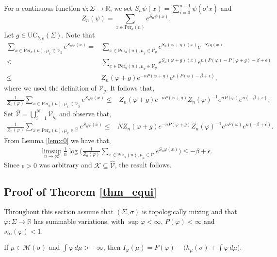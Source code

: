 \documentclass[letterpaper,11pt]{amsart}
\numberwithin{equation}{section}     %
\newcommand{\M}{\mathcal{M}}
\newcommand{\R}{\mathbb{R}}
\def\phi{\varphi}
\def\R{{\mathbb R}}
\def\M{{\mathcal M}}
\def\le{\leqslant}
\def\M{\mathcal{M}}
\begin{document}
For a continuous function $\psi:\Sigma\to\R$, we set $S_n \psi(x)= \sum_{i=0}^{n-1} \psi(\sigma^i x)$ and  
$$Z_n(\psi)=\sum_{x\in \text{Per}_a(n)}e^{S_n\psi(x)}. $$
Let $g\in \text{UC}_{b,\rho}(\Sigma)$. Note that 
 \begin{align*}
\sum_{x\in \text{Per}_a(n), \mu_x\in \mathcal{V}_g}e^{S_n\phi(x)} = & \sum_{x\in \text{Per}_a(n), \mu_x\in \mathcal{V}_g}e^{S_n(\phi+g)(x)}e^{-S_ng(x)}\\
\le & \sum_{x\in \text{Per}_a(n), \mu_x\in \mathcal{V}_g}e^{S_n(\phi+g)(x)} e^{n(P(\phi)-P(\phi+g)-\beta+\epsilon)}\\
\le & Z_n(\phi+g)e^{-nP(\phi+g)}e^{n(P(\phi)-\beta+\epsilon)},
\end{align*}
where we used the definition of $\mathcal{V}_g$. It follows that,
 \begin{align*}
\frac{1}{Z_n(\phi)}\sum_{x\in \text{Per}_a(n), \mu_x\in \mathcal{V}_g}e^{S_n\phi(x)} \le & Z_n(\phi+g)e^{-nP(\phi+g)}Z_n(\phi)^{-1}e^{nP(\phi)}e^{n(-\beta+\epsilon)}.
\end{align*}
Set $\widehat{\mathcal{V}}=\bigcup_{i=1}^N \mathcal{V}_{g_i}$ and observe that,
 \begin{align*}
\frac{1}{Z_n(\phi)}\sum_{x\in \text{Per}_a(n), \mu_x\in \widehat{\mathcal{V}}}e^{S_n\phi(x)} \le & N Z_n(\phi+g)e^{-nP(\phi+g)}Z_n(\phi)^{-1}e^{nP(\phi)}e^{n(-\beta+\epsilon)}.
\end{align*}
From Lemma \ref{lem:c0}  we have that, 
 \begin{align*}
\limsup_{n\to\infty}\frac{1}{n}\log\bigg(\frac{1}{Z_n(\phi)}\sum_{x\in \text{Per}_a(n), \mu_x\in \widehat{\mathcal{V}}}e^{S_n\phi(x)} \bigg)\le -\beta+\epsilon.
\end{align*}
Since $\epsilon>0$ was arbitrary and $\mathcal{K}\subseteq \widehat{\mathcal{V}}$, the result follows.


\subsection{Proof of Theorem \ref{thm_equi}}  

Throughout this section assume that $(\Sigma,\sigma)$ is topologically mixing and that $\phi:\Sigma\to\R$ has summable variations, with $\sup\phi<\infty$, $P(\phi)<\infty$ and $s_\infty(\phi)<1$. 

\begin{lemma} \label{lem:l2}
If $\mu \in \M(\sigma)$ and $\int \phi \, d\mu>-\infty$, then $I_\phi( \mu)= P(\phi)-\big(h_\mu(\sigma)+\int \phi \, d\mu\big).$ 
\end{lemma}
\end{document}
